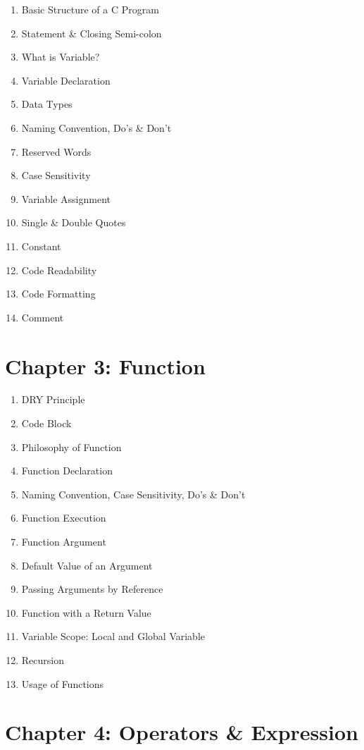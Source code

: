 \documentclass[a4paper,11pt]{article}
\begin{document}
	\begin{enumerate}
		\item Basic Structure of a C Program
		\item Statement \& Closing Semi-colon
		\item What is Variable?
		\item Variable Declaration
		\item Data Types
		\item Naming Convention, Do’s \& Don't
		\item Reserved Words
		\item Case Sensitivity
		\item Variable Assignment
		\item Single \& Double Quotes
		\item Constant
		\item Code Readability
		\item Code Formatting
		\item Comment
	\end{enumerate}


	\section*{ Chapter 3: Function }

	\begin{enumerate}
		\item DRY Principle
		\item Code Block
		\item Philosophy of Function
		\item Function Declaration
		\item Naming Convention, Case Sensitivity, Do’s \& Don't
		\item Function Execution
		\item Function Argument
		\item Default Value of an Argument
		\item Passing Arguments by Reference
		\item Function with a Return Value
		\item Variable Scope: Local and Global Variable
		\item Recursion
		\item Usage of Functions
	\end{enumerate}


	\section*{ Chapter 4: Operators \& Expression }
\end{document}
